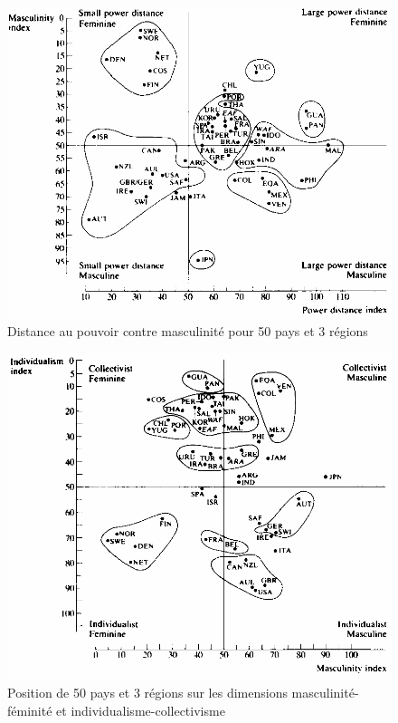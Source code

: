 \documentclass[12pt]{article}
\begin{document}
	  \begin{figure}[!ht]
	   \begin{center}
	     \includegraphics[width=0.65\linewidth]{hofstede_power_masc.png}
	     \caption{Distance au pouvoir contre masculinité pour 50 pays et 3 régions}
	   \end{center}
	  \end{figure}

	  \begin{figure}[!ht]
	   \begin{center}
	     \includegraphics[width=0.65\linewidth]{hofstede_masc_indivi.png}
	     \caption{Position de 50 pays et 3 régions sur les dimensions masculinité-féminité et individualisme-collectivisme}
	   \end{center}
	  \end{figure}
	  
\end{document}
